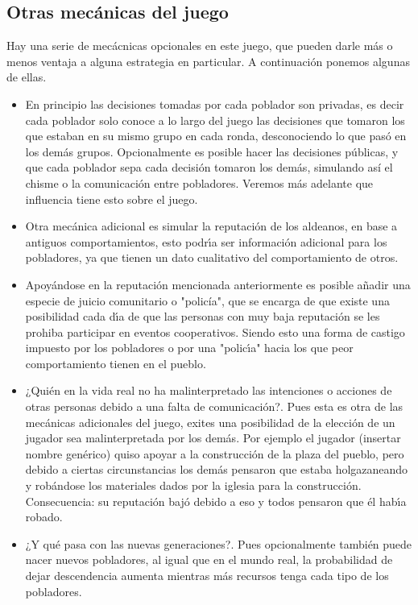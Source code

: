 \documentclass{article}
\begin{document}
\subsection{Otras mec\'anicas del juego}
Hay una serie de mec\'acnicas opcionales en este juego, que pueden darle m\'as o menos ventaja a alguna estrategia en particular.
A continuaci\'on ponemos algunas de ellas.
\begin{itemize}
      \item En principio las decisiones tomadas por cada poblador son privadas, es decir cada poblador solo conoce a lo largo del juego las decisiones
            que tomaron los que estaban en su mismo grupo en cada ronda, desconociendo lo que pas\'o en los dem\'as grupos. Opcionalmente es posible hacer las
            decisiones p\'ublicas, y que cada poblador sepa cada decisi\'on tomaron los dem\'as, simulando as\'i el chisme o la comunicaci\'on entre pobladores.
            Veremos m\'as adelante que influencia tiene esto sobre el juego.
      \item Otra mec\'anica adicional es simular la reputaci\'on de los aldeanos, en base a antiguos comportamientos, esto podr\'{\i}a ser informaci\'on
            adicional para los pobladores, ya que tienen un dato cualitativo del comportamiento de otros.
      \item Apoy\'andose en la reputaci\'on mencionada anteriormente es posible a\~nadir una especie de juicio comunitario o "polic\'ia", que se encarga de que existe una posibilidad
            cada d\'{\i}a de que las personas con muy baja reputaci\'on se les prohiba participar en eventos cooperativos. Siendo esto una forma de castigo impuesto
            por los pobladores o por una "polic\'{\i}a" hacia los que peor comportamiento tienen en el pueblo.
      \item ¿Qui\'en en la vida real no ha malinterpretado las intenciones o acciones de otras personas debido a una falta de comunicaci\'on?. Pues esta es otra de las
            mec\'anicas adicionales del juego, exites una posibilidad de la elecci\'on de un jugador sea malinterpretada por los dem\'as. Por ejemplo el jugador (insertar nombre gen\'erico)
            quiso apoyar a la construcci\'on de la plaza del pueblo, pero debido a ciertas circunstancias los dem\'as pensaron que estaba holgazaneando y rob\'andose los
            materiales dados por la iglesia para la construcci\'on. Consecuencia: su reputaci\'on baj\'o debido a eso y todos pensaron que \'el hab\'{\i}a robado.
      \item ¿Y qu\'e pasa con las nuevas generaciones?. Pues opcionalmente tambi\'en puede nacer nuevos pobladores, al igual que en el mundo real, la probabilidad de dejar descendencia aumenta
            mientras m\'as recursos tenga cada tipo de los pobladores. 
\end{itemize}
\newpage
\end{document}

